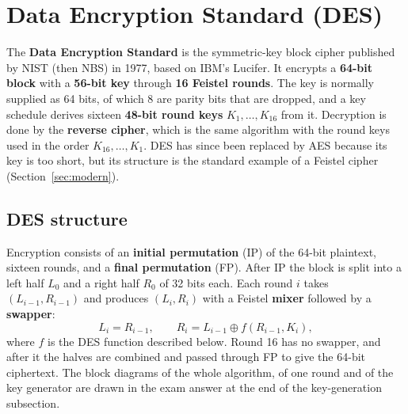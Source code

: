 \section{Data Encryption Standard (DES)}\label{sec:des}

The \textbf{Data Encryption Standard} is the symmetric-key block cipher published by NIST (then NBS) in 1977, based on IBM's Lucifer. It encrypts a \textbf{64-bit block} with a \textbf{56-bit key} through \textbf{16 Feistel rounds}. The key is normally supplied as 64 bits, of which 8 are parity bits that are dropped, and a key schedule derives sixteen \textbf{48-bit round keys} $K_1, \dots, K_{16}$ from it. Decryption is done by the \textbf{reverse cipher}, which is the same algorithm with the round keys used in the order $K_{16}, \dots, K_1$. DES has since been replaced by AES because its key is too short, but its structure is the standard example of a Feistel cipher (Section~\ref{sec:modern}).

\subsection{DES structure \hot}
Encryption consists of an \textbf{initial permutation} (IP) of the 64-bit plaintext, sixteen rounds, and a \textbf{final permutation} (FP). After IP the block is split into a left half $L_0$ and a right half $R_0$ of 32 bits each. Each round $i$ takes $(L_{i-1}, R_{i-1})$ and produces $(L_i, R_i)$ with a Feistel \textbf{mixer} followed by a \textbf{swapper}:
\[
L_i = R_{i-1}, \qquad R_i = L_{i-1} \oplus f(R_{i-1}, K_i),
\]
where $f$ is the DES function described below. Round 16 has no swapper, and after it the halves are combined and passed through FP to give the 64-bit ciphertext. The block diagrams of the whole algorithm, of one round and of the key generator are drawn in the exam answer at the end of the key-generation subsection.

